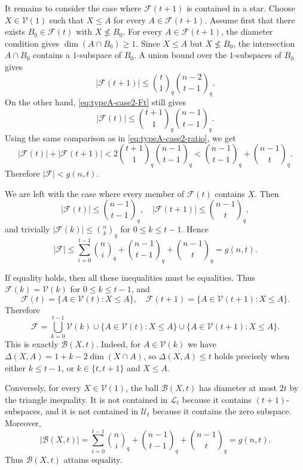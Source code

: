 \documentclass[11pt]{article}
\theoremstyle{definition}
\newcommand{\qbinom}[2]{\genfrac{(}{)}{0pt}{}{#1}{#2}_q}
\begin{document}
It remains to consider the case where $\mathcal F(t+1)$ is contained in a star. 
Choose $X\in\mathcal V(1)$ such that $X\le A$ for every $A\in\mathcal F(t+1)$. Assume first that there exists $B_0\in\mathcal F(t)$ with $X\not\le B_0$. 
For every $A\in\mathcal F(t+1)$, the diameter condition gives $\dim(A\cap B_0)\ge 1$. 
Since $X\le A$ but $X\not\le B_0$, the intersection $A\cap B_0$ contains a $1$-subspace of $B_0$. 
A union bound over the $1$-subspaces of $B_0$ gives
\begin{equation*}
|\mathcal F(t+1)|
\le
\qbinom{t}{1}\qbinom{n-2}{t-1}.
\end{equation*}
On the other hand, \eqref{eq:typeA-case2-Ft} still gives
\begin{equation*}
|\mathcal F(t)|
\le
\qbinom{t+1}{1}\qbinom{n-1}{t-1}.
\end{equation*}
Using the same comparison as in \eqref{eq:typeA-case2-ratio}, we get
\[
|\mathcal F(t)|+|\mathcal F(t+1)|
<
2\qbinom{t+1}{1}\qbinom{n-1}{t-1}
<
\qbinom{n-1}{t-1}+\qbinom{n-1}{t}.
\]
Therefore $|\mathcal F|<g(n,t)$.

We are left with the case where every member of $\mathcal F(t)$ contains $X$. 
Then
\[
|\mathcal F(t)|\le \qbinom{n-1}{t-1},\quad
|\mathcal F(t+1)|\le \qbinom{n-1}{t},
\]
and trivially $|\mathcal F(k)|\le \qbinom{n}{k}$ for $0\le k\le t-1$. 
Hence
\[
|\mathcal F|
\le
\sum_{i=0}^{t-1}\qbinom{n}{i}
+
\qbinom{n-1}{t-1}
+
\qbinom{n-1}{t}
=
g(n,t).
\]

If equality holds, then all these inequalities must be equalities. 
Thus $\mathcal F(k)=\mathcal V(k)$ for $0\le k\le t-1$, and
\[
\mathcal F(t)=\{A\in\mathcal V(t):X\le A\},\quad
\mathcal F(t+1)=\{A\in\mathcal V(t+1):X\le A\}.
\]
Therefore
\[
\mathcal F
=
\bigcup_{k=0}^{t-1}\mathcal V(k)
\cup
\{A\in\mathcal V(t):X\le A\}
\cup
\{A\in\mathcal V(t+1):X\le A\}.
\]
This is exactly $\mathcal B(X,t)$. Indeed, for $A\in\mathcal V(k)$ we have $\Delta(X,A)=1+k-2\dim(X\cap A)$, so $\Delta(X,A)\le t$ holds precisely when either $k\le t-1$, or $k\in\{t,t+1\}$ and $X\le A$.

Conversely, for every $X\in\mathcal V(1)$, the ball $\mathcal B(X,t)$ has diameter at most $2t$ by the triangle inequality. 
It is not contained in $\mathcal L_t$ because it contains $(t+1)$-subspaces, and it is not contained in $\mathcal U_t$ because it contains the zero subspace. 
Moreover,
\[
|\mathcal B(X,t)|
=
\sum_{i=0}^{t-1}\qbinom{n}{i}
+
\qbinom{n-1}{t-1}
+
\qbinom{n-1}{t}
=
g(n,t).
\]
Thus $\mathcal B(X,t)$ attains equality.
\end{document}
